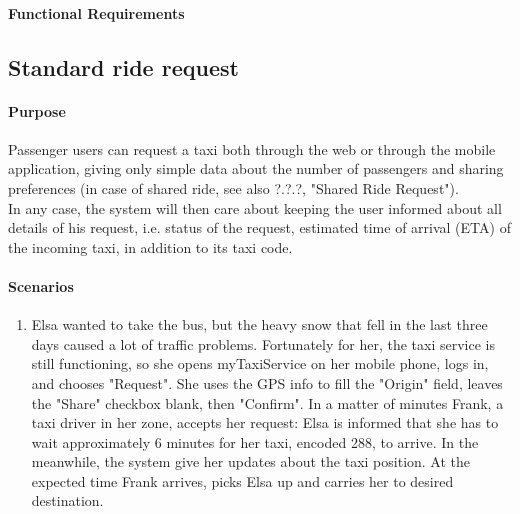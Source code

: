 \paragraph{Functional Requirements}

\subsection{Standard ride request}
\paragraph{Purpose}
Passenger users can request a taxi both through the web or through the mobile application, giving only simple data about the number of passengers and sharing preferences (in case of shared ride, see also ?.?.?, "Shared Ride Request").\\
In any case, the system will then care about keeping the user informed about all details of his request, i.e. status of the request, estimated time of arrival (ETA) of the incoming taxi, in addition to its taxi code.
\paragraph{Scenarios}
\begin{enumerate}
	\item Elsa wanted to take the bus, but the heavy snow that fell in the last three days caused a lot of traffic problems. Fortunately for her, the taxi service is still functioning, so she opens myTaxiService on her mobile phone, logs in, and chooses "Request".
	She uses the GPS info to fill the "Origin" field, leaves the "Share" checkbox blank, then "Confirm". In a matter of minutes Frank, a taxi driver in her zone, accepts her request: Elsa is informed that she has to wait approximately 6 minutes for her taxi, encoded 288, to arrive. In the meanwhile, the system give her updates about the taxi position. At the expected time Frank arrives, picks Elsa up and carries her to desired destination.
\end{enumerate}
